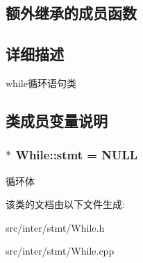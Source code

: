 \subsection*{额外继承的成员函数}


\subsection{详细描述}
while循环语句类 

\subsection{类成员变量说明}
\subsubsection[{\texorpdfstring{stmt}{stmt}}]{$\ast$ While\+::stmt = N\+U\+LL}\hypertarget{class_while_a97dfbf50f27b969c5b765ecfb1ef4ac2}{}\label{class_while_a97dfbf50f27b969c5b765ecfb1ef4ac2}
循环体 

该类的文档由以下文件生成\+:\begin{DoxyCompactItemize}
\item 
src/inter/stmt/While.\+h\item 
src/inter/stmt/While.\+cpp\end{DoxyCompactItemize}

